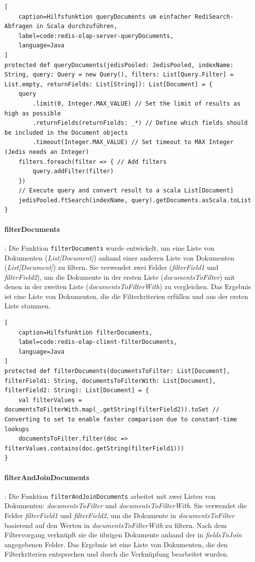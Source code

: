\begin{lstlisting}[
    caption=Hilfsfunktion queryDocuments um einfacher RediSearch-Abfragen in Scala durchzuführen,
    label=code:redis-olap-server-queryDocuments,
    language=Java
]
protected def queryDocuments(jedisPooled: JedisPooled, indexName: String, query: Query = new Query(), filters: List[Query.Filter] = List.empty, returnFields: List[String]): List[Document] = {
	query
		.limit(0, Integer.MAX_VALUE) // Set the limit of results as high as possible
		.returnFields(returnFields: _*) // Define which fields should be included in the Document objects
		.timeout(Integer.MAX_VALUE) // Set timeout to MAX Integer (Jedis needs an Integer)
	filters.foreach(filter => { // Add filters
		query.addFilter(filter)
	})
	// Execute query and convert result to a scala List[Document]
	jedisPooled.ftSearch(indexName, query).getDocuments.asScala.toList
}
\end{lstlisting}

\paragraph{filterDocuments}: Die Funktion \lstinline|filterDocuments| wurde entwickelt, um eine Liste von Dokumenten (\emph{List[Document]}) anhand einer anderen Liste von Dokumenten (\emph{List[Document]}) zu filtern. Sie verwendet zwei Felder (\emph{filterField1} und \emph{filterField2}), um die Dokumente in der ersten Liste (\emph{documentsToFilter}) mit denen in der zweiten Liste (\emph{documentsToFilterWith}) zu vergleichen. Das Ergebnis ist eine Liste von Dokumenten, die die Filterkriterien erfüllen und aus der ersten Liste stammen.

\begin{lstlisting}[
    caption=Hilfsfunktion filterDocuments,
    label=code:redis-olap-client-filterDocuments,
    language=Java
]
protected def filterDocuments(documentsToFilter: List[Document], filterField1: String, documentsToFilterWith: List[Document], filterField2: String): List[Document] = {
	val filterValues = documentsToFilterWith.map(_.getString(filterField2)).toSet // Converting to set to enable faster comparison due to constant-time lookups
	documentsToFilter.filter(doc => filterValues.contains(doc.getString(filterField1)))
}
\end{lstlisting}


\paragraph{filterAndJoinDocuments}: Die Funktion \lstinline|filterAndJoinDocuments| arbeitet mit zwei Listen von Dokumenten: \emph{documentsToFilter} und \emph{documentsToFilterWith}. Sie verwendet die Felder \emph{filterField1} und \emph{filterField2}, um die Dokumente in \emph{documentsToFilter} basierend auf den Werten in \emph{documentsToFilterWith} zu filtern. Nach dem Filtervorgang verknüpft sie die übrigen Dokumente anhand der in \emph{fieldsToJoin} angegebenen Felder. Das Ergebnis ist eine Liste von Dokumenten, die den Filterkriterien entsprechen und durch die Verknüpfung bearbeitet wurden.

